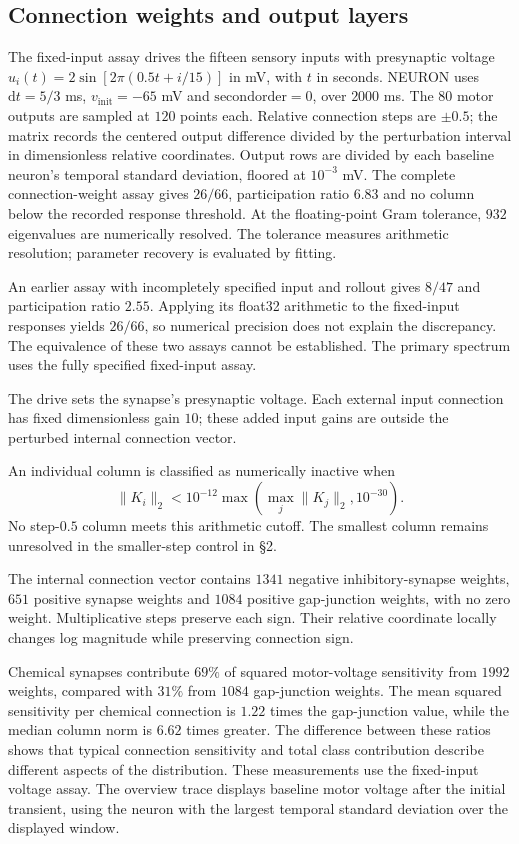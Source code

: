 \documentclass[11pt,letterpaper]{article}
\begin{document}
\subsection{Connection weights and output layers}
The fixed-input assay drives the fifteen sensory inputs with presynaptic voltage $u_i(t)=2\sin[2\pi(0.5t+i/15)]$ in mV, with $t$ in seconds. NEURON uses $\mathrm{d}t=5/3$ ms, $v_{\mathrm{init}}=-65$ mV and $\mathrm{secondorder}=0$, over $2000$ ms. The $80$ motor outputs are sampled at $120$ points each. Relative connection steps are $\pm0.5$; the matrix records the centered output difference divided by the perturbation interval in dimensionless relative coordinates. Output rows are divided by each baseline neuron's temporal standard deviation, floored at $10^{-3}$ mV. The complete connection-weight assay gives $26/66$, participation ratio $6.83$ and no column below the recorded response threshold. At the floating-point Gram tolerance, $932$ eigenvalues are numerically resolved. The tolerance measures arithmetic resolution; parameter recovery is evaluated by fitting.

An earlier assay with incompletely specified input and rollout gives $8/47$ and participation ratio $2.55$. Applying its float32 arithmetic to the fixed-input responses yields $26/66$, so numerical precision does not explain the discrepancy. The equivalence of these two assays cannot be established. The primary spectrum uses the fully specified fixed-input assay.

The drive sets the synapse's presynaptic voltage. Each external input connection has fixed dimensionless gain $10$; these added input gains are outside the perturbed internal connection vector.

An individual column is classified as numerically inactive when
\[
\|K_i\|_2<10^{-12}\max(\max_j\|K_j\|_2,10^{-30}).
\]
No step-$0.5$ column meets this arithmetic cutoff. The smallest column remains unresolved in the smaller-step control in \S2.

The internal connection vector contains $1341$ negative inhibitory-synapse weights, $651$ positive synapse weights and $1084$ positive gap-junction weights, with no zero weight. Multiplicative steps preserve each sign. Their relative coordinate locally changes log magnitude while preserving connection sign.

Chemical synapses contribute $69\%$ of squared motor-voltage sensitivity from $1992$ weights, compared with $31\%$ from $1084$ gap-junction weights. The mean squared sensitivity per chemical connection is $1.22$ times the gap-junction value, while the median column norm is $6.62$ times greater. The difference between these ratios shows that typical connection sensitivity and total class contribution describe different aspects of the distribution. These measurements use the fixed-input voltage assay. The overview trace displays baseline motor voltage after the initial transient, using the neuron with the largest temporal standard deviation over the displayed window.
\end{document}
